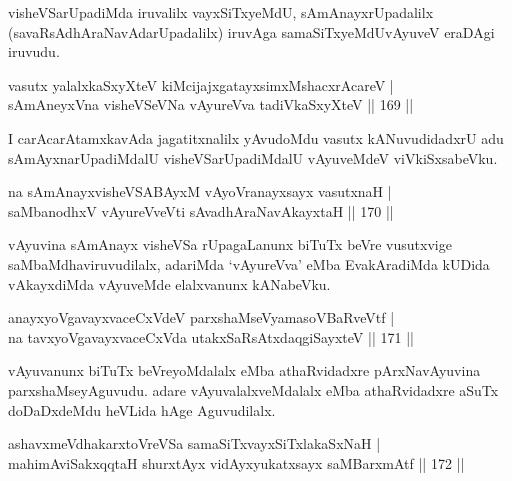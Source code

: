 \begin{artha}
visheVSarUpadiMda iruvalilx vayxSiTxyeMdU, sAmAnayxrUpadalilx (savaRsAdhAraNavAdarUpadalilx) iruvAga samaSiTxyeMdUvAyuveV eraDAgi iruvudu.
\end{artha}

\begin{shl}
vasutx yalalxkaSxyXteV kiMcijajxgatayxsimxMshacxrAcareV |\\
sAmAneyxVna visheVSeVNa vAyureVva tadiVkaSxyXteV \hfill || 169 ||
\end{shl}

\begin{artha}
I carAcarAtamxkavAda jagatitxnalilx yAvudoMdu vasutx kANuvudidadxrU adu sAmAyxnarUpadiMdalU visheVSarUpadiMdalU vAyuveMdeV viVkiSxsabeVku.
\end{artha}

\begin{shl}
na sAmAnayxvisheVSABAyxM vAyoVranayxsayx vasutxnaH |\\
saMbanodhxV vAyureVveVti sAvadhAraNavAkayxtaH \hfill || 170 ||
\end{shl}

\begin{artha}
vAyuvina sAmAnayx visheVSa rUpagaLanunx biTuTx beVre vusutxvige saMbaMdhaviruvudilalx, adariMda `vAyureVva' eMba EvakAradiMda kUDida vAkayxdiMda vAyuveMde elalxvanunx kANabeVku.
\end{artha}


\begin{shl}
anayxyoVgavayxvaceCxVdeV parxshaMseVyamasoVBaRveVtf |\\
na tavxyoVgavayxvaceCxVda utakxSaRsAtxdaqgiSayxteV \hfill || 171 ||
\end{shl}

\begin{artha}
vAyuvanunx biTuTx beVreyoMdalalx eMba athaRvidadxre pArxNavAyuvina parxshaMseyAguvudu. adare vAyuvalalxveMdalalx eMba athaRvidadxre aSuTx doDaDxdeMdu heVLida hAge Aguvudilalx.
\end{artha}


\begin{shl}
ashavxmeVdhakarxtoVreVSa samaSiTxvayxSiTxlakaSxNaH |\\
mahimA\s \s viSakxqqtaH shurxtAyx vidAyxyukatxsayx saMBarxmAtf \hfill || 172 ||
\end{shl}

